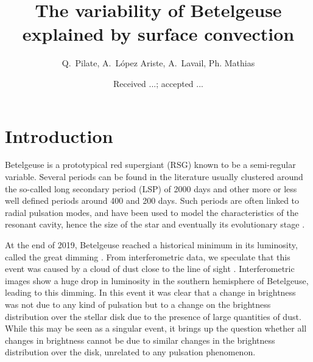 \documentclass{aa}
\begin{document}
 


   \title{The variability  of Betelgeuse explained by surface convection}


    \author{{ Q.~Pilate},{ A.~L{\'o}pez Ariste},{ A.~Lavail},{ Ph. Mathias} }


   \date{Received ...; accepted ...}

 
  \abstract


   \keywords{
               }

   \maketitle
%

\section{Introduction}

Betelgeuse is a prototypical red supergiant (RSG) known to be a semi-regular variable. Several periods can be found in the 
literature usually clustered around the so-called long secondary period (LSP) of 2000 days and other more or less well defined 
periods around 400 and 200 days. Such periods are often linked to radial pulsation modes,   and have been used to model 
the characteristics of the resonant cavity, hence the size of the star and eventually its evolutionary stage \citep{saio_evolutionary_2023}.


At the end of 2019, Betelgeuse reached a historical minimum in its luminosity, called the great dimming \citep{guinan_fall_2020}. 
From interferometric data, we speculate that this event was caused by a cloud of dust close to the line of sight \citep{montarges_dusty_2021}. 
Interferometric images show a huge drop in luminosity in the southern hemisphere of Betelgeuse, leading to this dimming. In this event it was clear that a change in brightness was not due to any kind of pulsation but to a change on the 
brightness distribution over the stellar disk due to the presence of large quantities of dust. While this may be seen as 
a singular event, it brings up the question whether all changes in brightness cannot be due to similar changes in the brightness 
distribution over the disk, unrelated to any pulsation phenomenon. 
\end{document}

